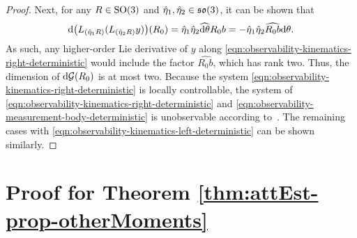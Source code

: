 \begin{proof}
	Next, for any $R\in\mathrm{SO}(3)$ and $\hat{\eta}_1, \hat{\eta}_2\in\mathfrak{so}(3)$, it can be shown that
	\begin{align*}
		\mathrm{d} \big(L_{(\hat{\eta}_1R)}(L_{(\hat{\eta}_2R)}y)\big)(R_0) = \hat{\eta}_1\hat{\eta}_2\widehat{\mathrm{d} \theta}R_0b = -\hat{\eta}_1\hat{\eta}_2 \widehat{R_0b} \mathrm{d} \theta.
	\end{align*}
	As such, any higher-order Lie derivative of $y$ along \eqref{eqn:observability-kinematics-right-deterministic} would include the factor $\widehat{R_0 b}$, which has rank two.
	Thus, the dimension of $\mathrm{d} \mathcal{G}(R_0)$ is at most two.
	Because the system \eqref{eqn:observability-kinematics-right-deterministic} is locally controllable, the system of \eqref{eqn:observability-kinematics-right-deterministic} and \eqref{eqn:observability-measurement-body-deterministic} is unobservable according to~\cite[Theorem 3.12]{hermann1977nonlinear}.
	The remaining cases with \eqref{eqn:observability-kinematics-left-deterministic} can be shown similarly.
\end{proof}

\chapter{Proof for Theorem \ref{thm:attEst-prop-otherMoments}} \label{app:attEst-prop-otherMoments}

